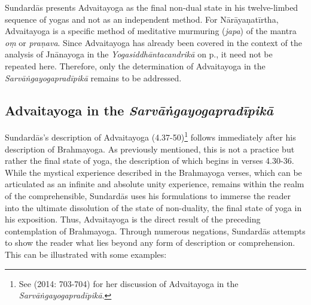 Sundardās presents Advaitayoga as the final non-dual state in his twelve-limbed sequence of yogas and not as an independent method. For Nārāyaṇatīrtha, Advaitayoga is a specific method of meditative murmuring (\textit{japa}) of the mantra \textit{oṃ} or \textit{praṇava}. Since Advaitayoga has already been covered in the context of the analysis of Jnānayoga in the \textit{Yogasiddhāntacandrikā} on p.\pageref{jnanayogaintrocandrika}, it need not be repeated here. Therefore, only the determination of Advaitayoga in the \textit{Sarvāṅgayogapradīpikā} remains to be addressed.

\subsection{Advaitayoga in the \textit{Sarvāṅgayogapradīpikā}}
\label{sundaradvaita}

Sundardās's description of Advaitayoga (4.37-50)\footnote{See \citeauthor{burger2014sarvangayogapradipika} (2014: 703-704) for her discussion of Advaitayoga in the \textit{Sarvāṅgayogapradīpikā}.} follows immediately after his description of Brahmayoga. As previously mentioned, this is not a practice but rather the final state of yoga, the description of which begins in verses 4.30-36. While the mystical experience described in the Brahmayoga verses, which can be articulated as an infinite and absolute unity experience, remains within the realm of the comprehensible, Sundardās uses his formulations to immerse the reader into the ultimate dissolution of the state of non-duality, the final state of yoga in his exposition. Thus, Advaitayoga is the direct result of the preceding contemplation of Brahmayoga. Through numerous negations, Sundardās attempts to show the reader what lies beyond any form of description or comprehension. This can be illustrated with some examples:

